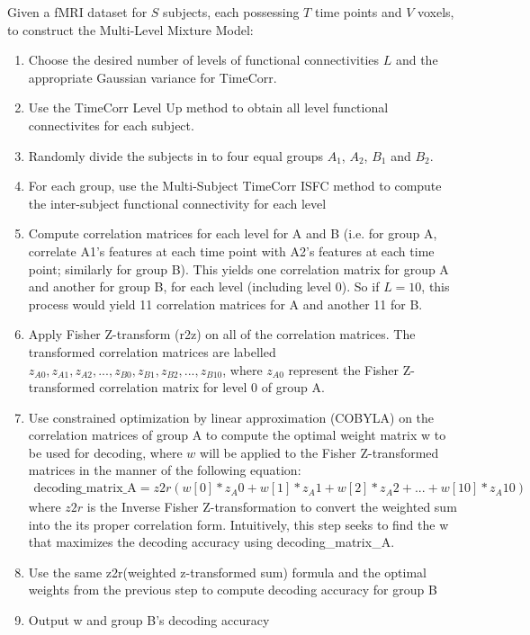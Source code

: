 \documentclass[11pt]{article}
\begin{document}
Given a fMRI dataset for $S$ subjects, each possessing $T$ time points and $V$ voxels, to construct the Multi-Level Mixture Model:
\begin{enumerate}
\item Choose the desired number of levels of functional connectivities $L$ and the appropriate Gaussian variance for TimeCorr.
\item Use the TimeCorr Level Up method to obtain all level functional connectivites for each subject.
\item Randomly divide the subjects in to four equal groups $A_1$, $A_2$, $B_1$ and $B_2$.
\item For each group, use the Multi-Subject TimeCorr ISFC method to compute the inter-subject functional connectivity for each level
\item Compute correlation matrices for each level for A and B (i.e. for group A, correlate A1's features at each time point with A2's features at each time point; similarly for group B). This yields one correlation matrix for group A and another for group B, for each level (including level 0). So if $L=10$, this process would yield 11 correlation matrices for A and another 11 for B.
\item Apply Fisher Z-transform (r2z) on all of the correlation matrices. The transformed correlation matrices are labelled $z_{A0}, z_{A1}, z_{A2}, ..., z_{B0}, z_{B1}, z_{B2}, ..., z_{B10}$, where $z_{A0}$ represent the Fisher Z-transformed correlation matrix for level 0 of group A.
\item Use constrained optimization by linear approximation (COBYLA) on the correlation matrices of group A to compute the optimal weight matrix w to be used for decoding, where $w$ will be applied to the Fisher Z-transformed matrices in the manner of the following equation:
\begin{align*}
\text{decoding\_matrix\_A} = z2r(w[0]*z_A0 + w[1]*z_A1 + w[2]*z_A2 + ... + w[10]*z_A10)
\end{align*}
where $z2r$ is the Inverse Fisher Z-transformation to convert the weighted sum into the its proper correlation form. Intuitively, this step seeks to find the w that maximizes the decoding accuracy using decoding\_matrix\_A.
\item Use the same z2r(weighted z-transformed sum) formula and the optimal weights from the previous step to compute decoding accuracy for group B
\item Output w and group B's decoding accuracy
\end{enumerate}
\end{document}
